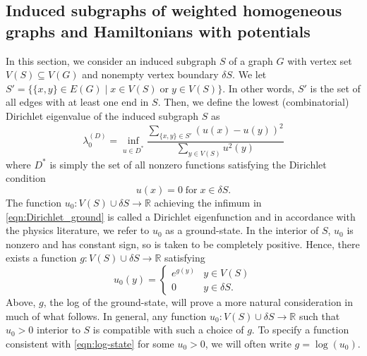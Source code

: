 \subsection{Induced subgraphs of weighted homogeneous graphs and Hamiltonians with potentials}\label{sec:multidimensional}
In this section, we consider an induced subgraph $S$ of a graph $G$ with vertex set $V(S) \subseteq V(G)$ and nonempty vertex boundary $\delta S$. We let $S' = \{\{x,y\}\in E(G) \; \vert \; x \in V(S) \; \text{or} \; y \in V(S)\}$. In other words, $S'$ is the set of all edges with at least one end in $S$. Then, we define the lowest (combinatorial) Dirichlet eigenvalue of the induced subgraph $S$ as
\begin{equation}\label{eqn:Dirichlet_ground}
	\lambda^{(D)}_0 = \inf_{u \in D^{*}}\frac{\displaystyle\sum_{\{x,y\} \in S'}\left(u(x)-u(y)\right)^2}{\displaystyle\sum_{y \in V(S)} u^2(y)}
\end{equation}
where $D^*$ is simply the set of all nonzero functions satisfying the Dirichlet condition
\begin{equation*}
	u(x) = 0 \; \text{for} \; x \in \delta S.
\end{equation*}
The function $u_0:V(S)\cup \delta S \rightarrow \mathbb{R}$ achieving the infimum in \cref{eqn:Dirichlet_ground} is called a Dirichlet eigenfunction and in accordance with the physics literature, we refer to $u_0$ as a ground-state. In the interior of $S$, $u_0$ is nonzero and has constant sign, so is taken to be completely positive. Hence, there exists a function $g:V(S)\cup\delta S \longrightarrow \mathbb{R}$ satisfying 
\begin{equation}\label{eqn:log-state}
	u_0(y) = 
	\begin{cases}
		e^{g(y)} & y \in V(S) \\
		0 & y \in \delta S.
	\end{cases}
\end{equation}
Above, $g$, the log of the ground-state, will prove a more natural consideration in much of what follows. In general, any function $u_0:V(S)\cup \delta S \rightarrow \mathbb{R}$ such that $u_0 > 0$ interior to $S$ is compatible with such a choice of $g$. To specify a function consistent with \cref{eqn:log-state} for some $u_0 >0$, we will often write $g=\log(u_0)$. 

